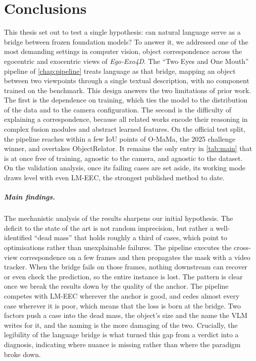 \chapter{Conclusions}
\label{chap:conclusions}

This thesis set out to test a single hypothesis: can natural language serve as a bridge between frozen foundation models? To answer it, we addressed one of the most demanding settings in computer vision, object correspondence across the egocentric and exocentric views of \textit{Ego-Exo4D}. The ``Two Eyes and One Mouth'' pipeline of \cref{chap:pipeline} treats language as that bridge, mapping an object between two viewpoints through a single textual description, with no component trained on the benchmark. This design answers the two limitations of prior work. The first is the dependence on training, which ties the model to the distribution of the data and to the camera configuration. The second is the difficulty of explaining a correspondence, because all related works encode their reasoning in complex fusion modules and abstract learned features. On the official test split, the pipeline reaches within a few IoU points of O-MaMa, the 2025 challenge winner, and overtakes ObjectRelator. It remains the only entry in \cref{tab:main} that is at once free of training, agnostic to the camera, and agnostic to the dataset. On the validation analysis, once its failing cases are set aside, its working mode draws level with even LM-EEC, the strongest published method to date.

\paragraph{Main findings.} The mechanistic analysis of the results sharpens our initial hypothesis. The deficit to the state of the art is not random imprecision, but rather a well-identified ``dead mass'' that holds roughly a third of cases, which point to optimisations rather than unexplainable failures. The pipeline executes the cross-view correspondence on a few frames and then propagates the mask with a video tracker. When the bridge fails on those frames, nothing downstream can recover or even check the prediction, so the entire instance is lost. The pattern is clear once we break the results down by the quality of the anchor. The pipeline competes with LM-EEC wherever the anchor is good, and cedes almost every case wherever it is poor, which means that the loss is born at the bridge. Two factors push a case into the dead mass, the object's size and the name the VLM writes for it, and the naming is the more damaging of the two. Crucially, the legibility of the language bridge is what turned this gap from a verdict into a diagnosis, indicating where nuance is missing rather than where the paradigm broke down.

